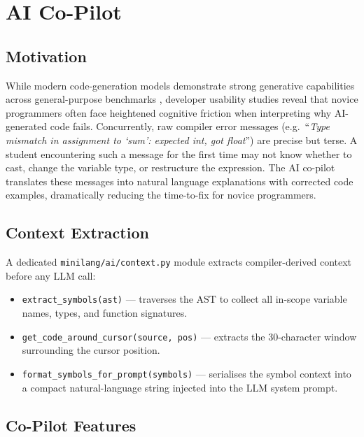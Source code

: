 \documentclass[conference]{IEEEtran}
\begin{document}
\section{AI Co-Pilot}
\label{sec:ai}

\subsection{Motivation}

While modern code-generation models demonstrate strong generative capabilities
across general-purpose benchmarks \cite{copilot, austin2021}, developer usability
studies \cite{vaithilingam2022} reveal that novice programmers often face
heightened cognitive friction when interpreting why AI-generated code fails.
Concurrently, raw compiler error messages (e.g.\ ``\textit{Type mismatch in
assignment to `sum': expected int, got float}'') are precise but
terse. A student encountering such a message for the first time may not
know whether to cast, change the variable type, or restructure the
expression. The AI co-pilot translates these messages into natural
language explanations with corrected code examples, dramatically
reducing the time-to-fix for novice programmers.

\subsection{Context Extraction}

A dedicated \texttt{minilang/ai/context.py} module extracts
compiler-derived context before any LLM call:

\begin{itemize}
  \item \texttt{extract\_symbols(ast)} --- traverses the AST to collect
        all in-scope variable names, types, and function signatures.
  \item \texttt{get\_code\_around\_cursor(source, pos)} --- extracts the
        30-character window surrounding the cursor position.
  \item \texttt{format\_symbols\_for\_prompt(symbols)} --- serialises the
        symbol context into a compact natural-language string injected
        into the LLM system prompt.
\end{itemize}

\subsection{Co-Pilot Features}
\end{document}
